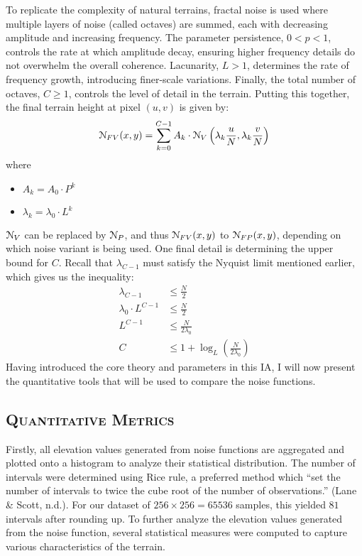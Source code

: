 To replicate the complexity of natural terrains, fractal noise is used where multiple layers of noise (called octaves) are summed, each with 
decreasing amplitude and increasing frequency. The parameter persistence, $0<p<1$, controls the rate at which amplitude decay, ensuring higher 
frequency details do not overwhelm the overall coherence. Lacunarity, $L>1$, determines the rate of frequency growth, introducing finer-scale 
variations. Finally, the total number of octaves, $C\ge 1$, controls the level of detail in the terrain. Putting this together, the final terrain 
height at pixel $(u,v)$ is given by:
\[\EuScript{N}_{FV}(x,y)=\sum_{k=0}^{C-1}A_k\cdot\EuScript{N}_V\left(\lambda_k\frac{u}{N},\lambda_k\frac{v}{N}\right)\]
where
\begin{itemize}
    \item $A_k=A_0\cdot P^k$
    \item $\lambda_k=\lambda_0\cdot L^k$
\end{itemize}
$\EuScript{N}_V$ can be replaced by $\EuScript{N}_P$, and thus $\EuScript{N}_{FV}(x,y)$ to $\EuScript{N}_{FP}(x,y)$, depending on which noise variant 
is being used. One final detail is determining the upper bound for $C$. Recall that $\lambda_{C-1}$ must satisfy the Nyquist limit mentioned earlier, 
which gives us the inequality:
\begin{align*}
    \lambda_{C-1}&\le \frac{N}{2}\\
    \lambda_0\cdot L^{C-1} &\le \frac{N}{2}\\
    L^{C-1} &\le \frac{N}{2\lambda_0}\\
    C &\le 1+\log_L\left(\frac{N}{2\lambda_0}\right)
\end{align*}
Having introduced the core theory and parameters in this IA, I will now present the quantitative tools that will be used to compare the noise functions.

\subsection{\textsc{Quantitative Metrics}}
\vspace*{-10pt}

Firstly, all elevation values generated from noise functions are aggregated and plotted onto a histogram to analyze their statistical distribution. The 
number of intervals were determined using Rice rule, a preferred method which “set the number of intervals to twice the cube root of the number of 
observations.” (Lane \& Scott, n.d.). For our dataset of $256\times256=65536$ samples, this yielded $81$ intervals after rounding up. To further analyze 
the elevation values generated from the noise function, several statistical measures were computed to capture various characteristics of the terrain.

